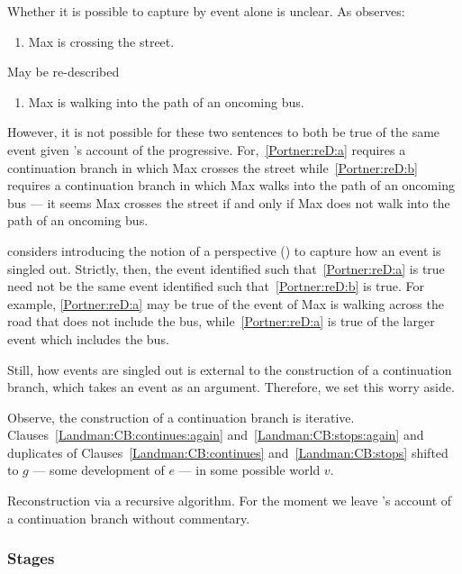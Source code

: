 \begin{note}
{    Whether it is possible to capture by event alone is unclear.
    As \textcite[1256]{Portner:2011vi} observes:
    \begin{enumerate}[label=\arabic*., ref=(\arabic*)]
    \item
      \label{Portner:reD:a}
      Max is crossing the street.
    \end{enumerate}
    May be re-described
    \begin{enumerate}[label=\arabic*\('\)., ref=(\arabic*\('\))]
    \item
      \label{Portner:reD:b}
      Max is walking into the path of an oncoming bus.
    \end{enumerate}
    However, it is not possible for these two sentences to both be true of the same event given \citeauthor{Landman:1992wh}'s account of the progressive.
    For,~\ref{Portner:reD:a} requires a continuation branch in which Max crosses the street while~\ref{Portner:reD:b} requires a continuation branch in which Max walks into the path of an oncoming bus --- it seems Max crosses the street if and only if Max does not walk into the path of an oncoming bus.

    \citeauthor{Landman:1992wh} considers introducing the notion of a perspective (\citeyear[30--31]{Landman:1992wh}) to capture how an event is singled out.
    Strictly, then, the event identified such that~\ref{Portner:reD:a} is true need not be the same event identified such that~\ref{Portner:reD:b} is true.
    For example, \ref{Portner:reD:a} may be true of the event of Max is walking across the road that does not include the bus, while~\ref{Portner:reD:a} is true of the larger event which includes the bus.

    Still, how events are singled out is external to the construction of a continuation branch, which takes an event as an argument.
    Therefore, we set this worry aside.
  }

  Observe, the construction of a continuation branch is iterative.
  Clauses~\ref{Landman:CB:continues:again} and~\ref{Landman:CB:stops:again} and duplicates of Clauses~\ref{Landman:CB:continues} and~\ref{Landman:CB:stops} shifted to \(g\) --- some development of \(e\) --- in some possible world \(v\).

  Reconstruction via a recursive algorithm.
  For the moment we leave \citeauthor{Landman:1992wh}'s account of a continuation branch without commentary.
\end{note}

\subsubsection{Stages}

